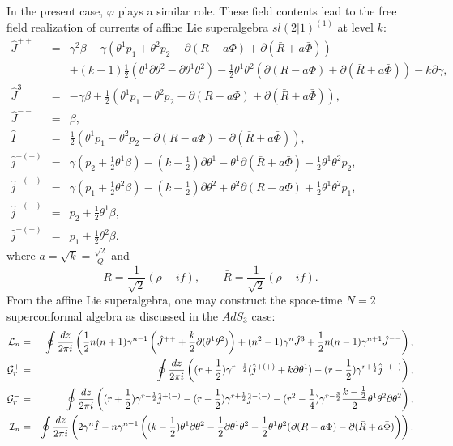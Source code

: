 \documentclass[a4paper,12pt]{article}
\begin{document}
In the present case, $\varphi$ plays a similar role.
These field contents lead to the free field realization of currents of 
affine Lie superalgebra $sl(2|1)^{(1)}$ at level $k$\cite{It0}:
\begin{eqnarray}
\hat{J}^{++}&=&
\gamma^2\beta-\gamma\left(
\theta^1p_1+\theta^2p_2-\partial(R-a\Phi)+\partial(\bar R+a\bar\Phi)
\right)\nonumber\\
&&
+(k-1)\frac{1}{2}(\theta^1\partial\theta^2-\partial\theta^1\theta^2)
-\frac{1}{2}\theta^1\theta^2\left(
\partial(R-a\Phi)+\partial(\bar R+a\bar\Phi)\right)
-k\partial\gamma
,\nonumber\\
\hat{J}^3&=&
-\gamma\beta+\frac{1}{2}\left(
\theta^1p_1+\theta^2p_2-\partial(R-a\Phi)+\partial(\bar R+a\bar\Phi)
\right),\nonumber\\
\hat{J}^{--}&=&\beta,\nonumber\\
\hat{I}&=&\frac{1}{2}\left(
\theta^1p_1-\theta^2p_2-\partial(R-a\Phi)-\partial(\bar R+a\bar\Phi)
\right),\nonumber\\
\hat{j}^{+(+)}&=&
\gamma(p_2+\frac{1}{2}\theta^1\beta)-(k-\frac{1}{2})\partial\theta^1
-\theta^1\partial(\bar R+a\bar\Phi)-\frac{1}{2}\theta^1\theta^2p_2,
\nonumber\\
\hat{j}^{+(-)}&=&
\gamma(p_1+\frac{1}{2}\theta^2\beta)-(k-\frac{1}{2})\partial\theta^2
+\theta^2\partial(R-a\Phi)+\frac{1}{2}\theta^1\theta^2p_1
,\nonumber\\
\hat{j}^{-(+)}&=&
p_2+\frac{1}{2}\theta^1\beta,\nonumber\\
\hat{j}^{-(-)}&=&
p_1+\frac{1}{2}\theta^2\beta.
\end{eqnarray}
where $a=\sqrt{k}=\frac{\sqrt{2}}{Q}$ and
\begin{equation}
R=\frac{1}{\sqrt{2}}(\rho+if),\qquad
\bar R=\frac{1}{\sqrt{2}}(\rho-if).
\end{equation}
{}From the affine Lie superalgebra,
one may construct the space-time $N=2$  superconformal algebra as
discussed in the $AdS_{3}$ case\cite{It}:
\begin{eqnarray}
{\cal L}_n&=&\oint{dz\over 2\pi i}\left(\frac{1}{2}n(n+1)\gamma^{n-1}\left(
\hat{J}^{++}+{k\over2}\partial(\theta^{1}\theta^{2})\right) 
+(n^2-1)\gamma^n \hat{J}^3+\frac{1}{2}n(n-1)\gamma^{n+1} \hat{J}^{--}\right),
\nonumber\\
{\cal G}^+_r&=&\oint{dz\over 2\pi i}\left(
(r+\frac{1}{2})\gamma^{r-\frac{1}{2}}( \hat{j}^{+(+)}+k\partial\theta^1)
-(r-\frac{1}{2})\gamma^{r+\frac{1}{2}} \hat{j}^{-(+)}\right),
\nonumber\\
{\cal G}^-_r&=&\oint{dz\over 2\pi i}\left(
(r+\frac{1}{2})\gamma^{r-\frac{1}{2}} \hat{j}^{+(-)}
-(r-\frac{1}{2})\gamma^{r+\frac{1}{2}}\hat{j}^{-(-)}
-(r^2-{1\over4})\gamma^{r-{3\over2}}{k-{1\over2}\over2}\theta^{1}\theta^{2}
\partial \theta^2
\right),
\nonumber\\
{\cal I}_n&=&\oint{dz\over 2\pi i}\left(
2\gamma^n\hat I-n\gamma^{n-1}\left(
(k-{1\over2})\theta^1\partial\theta^2
-{1\over2}\partial\theta^1\theta^2-{1\over2}
\theta^1\theta^2(\partial(R-a\Phi)-\partial(\bar{R}+a\bar{\Phi})\right)\right).
\nonumber\\
\label{eq:gen1}
\end{eqnarray}
\end{document}
